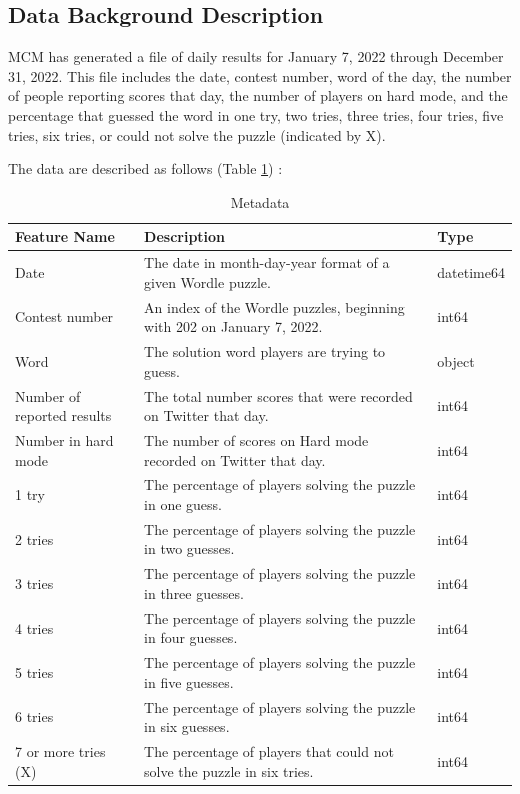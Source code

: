 \documentclass[
  journal=medium,
  manuscript=Report,
  year=2023,
  volume=37,
]{cup-journal}
\begin{document}
\subsection{Data Background Description}

MCM has generated a file of daily results for January 7, 2022 through December 31, 2022. This file includes the date, contest number, word of the day, the number of people reporting scores that day, the number of players on hard mode, and the percentage that guessed the word in one try, two tries, three tries, four tries, five tries, six tries, or could not solve the puzzle (indicated by X).

The data are described as follows (Table \ref{attribute}) :

\begin{table}[hbt!]
    \begin{threeparttable}
    \caption{Metadata}
    \label{attribute}
    \begin{tabular}{lll}
    \toprule
    \headrow Feature Name & Description & Type \\
    \midrule
    Date & The date in month-day-year format of a given Wordle puzzle. & datetime64 \\ 
    \midrule
    Contest number & An index of the Wordle puzzles, beginning with 202 on January 7, 2022. & int64 \\ 
    \midrule
    Word & The solution word players are trying to guess. & object \\ 
    \midrule
    Number of reported results & The total number scores that were recorded on Twitter that day. & int64 \\ 
    \midrule
    Number in hard mode  & The number of scores on Hard mode recorded on Twitter that day. & int64 \\ 
    \midrule
    1 try & The percentage of players solving the puzzle in one guess. & int64 \\ 
    \midrule
    2 tries & The percentage of players solving the puzzle in two guesses. & int64 \\ 
    \midrule
    3 tries & The percentage of players solving the puzzle in three guesses. & int64 \\ 
    \midrule
    4 tries & The percentage of players solving the puzzle in four guesses. & int64 \\ 
    \midrule
    5 tries & The percentage of players solving the puzzle in five guesses. & int64 \\ 
    \midrule
    6 tries & The percentage of players solving the puzzle in six guesses. & int64 \\ 
    \midrule
    7 or more tries (X) & The percentage of players that could not solve the puzzle in six tries. & int64 \\ 
    \bottomrule 
    \end{tabular}
    \end{threeparttable}
\end{table}
\end{document}

